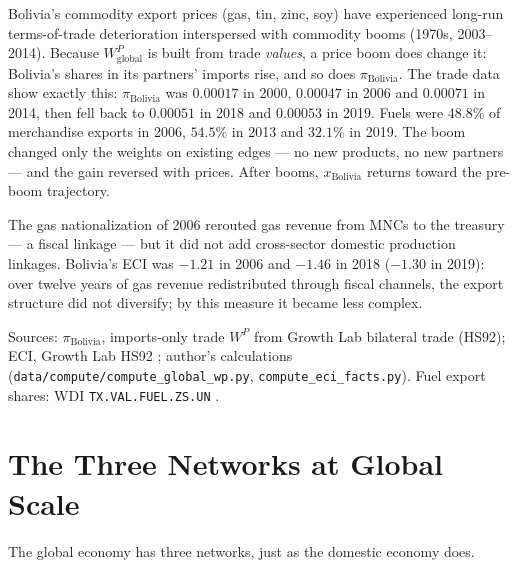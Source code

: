 \documentclass[../structural_economics_book.tex]{subfiles}
\begin{document}
\begin{example}\label{ch16:ex:bot_terms}
Bolivia's commodity export prices (gas, tin, zinc, soy) have experienced long-run terms-of-trade deterioration interspersed with commodity booms (1970s, 2003--2014). Because $W^P_{\text{global}}$ is built from trade \emph{values}, a price boom does change it: Bolivia's shares in its partners' imports rise, and so does $\pi_{\text{Bolivia}}$. The trade data show exactly this: $\pi_{\text{Bolivia}}$ was $0.00017$ in 2000, $0.00047$ in 2006 and $0.00071$ in 2014, then fell back to $0.00051$ in 2018 and $0.00053$ in 2019. Fuels were $48.8\%$ of merchandise exports in 2006, $54.5\%$ in 2013 and $32.1\%$ in 2019. The boom changed only the weights on existing edges --- no new products, no new partners --- and the gain reversed with prices. After booms, $x_{\text{Bolivia}}$ returns toward the pre-boom trajectory.

The gas nationalization of 2006 rerouted gas revenue from MNCs to the treasury --- a fiscal linkage --- but it did not add cross-sector domestic production linkages. Bolivia's ECI was $-1.21$ in 2006 and $-1.46$ in 2018 ($-1.30$ in 2019): over twelve years of gas revenue redistributed through fiscal channels, the export structure did not diversify; by this measure it became less complex.
\par\footnotesize Sources: $\pi_{\text{Bolivia}}$, imports-only trade $W^P$ from Growth Lab bilateral trade (HS92); ECI, Growth Lab HS92 \citep{growthlab2026atlas}; author's calculations (\texttt{data/compute/compute\_global\_wp.py}, \texttt{compute\_eci\_facts.py}). Fuel export shares: WDI \texttt{TX.VAL.FUEL.ZS.UN} \citep{worldbank2026wdi}.
\end{example}


\section{The Three Networks at Global Scale}
\label{ch16:sec:three_global}

The global economy has three networks, just as the domestic economy does.
\end{document}

